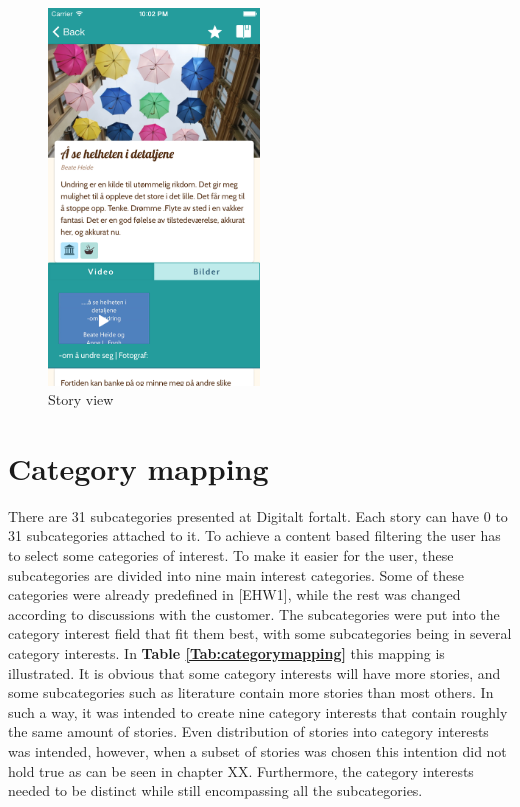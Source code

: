 \begin{figure}[h!]
	\centering
	\includegraphics[width=0.5\textwidth]{fig/story_view}
	\caption{Story view}
	\label{Fig:story_view}
\end{figure}


\section{Category mapping} 
\label{sec:categorymapping}

There are 31 subcategories presented at Digitalt fortalt. Each story can have 0 to 31 subcategories attached to it. To achieve a content based filtering the user has to select some categories of interest. To make it easier for the user, these subcategories are divided into nine main interest categories. Some of these categories were already predefined in [EHW1], while the rest was changed according to discussions with the customer. The subcategories were put into the category interest field that fit them best, with some subcategories being in several category interests. In \textbf{Table \ref{Tab:categorymapping}} this mapping is illustrated. It is obvious that some category interests will have more stories, and some subcategories such as literature contain more stories than most others. In such a way, it was intended to create nine category interests that contain roughly the same amount of stories. Even distribution of stories into category interests was intended, however, when a subset of stories was chosen this intention did not hold true as can be seen in chapter XX. Furthermore, the category interests needed to be distinct while still encompassing all the subcategories. 


